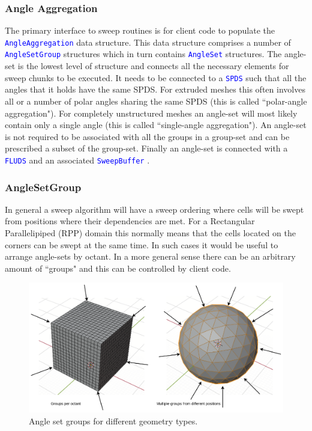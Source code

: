 \documentclass[11pt,letterpaper,titlepage]{article}
\newcommand{\xmltag}[1]{\textcolor{blue}{ \texttt{#1}} }
\numberwithin{equation}{section}
\begin{document}
\subsubsection{Angle Aggregation}
The primary interface to sweep routines is for client code to populate the \xmltag{AngleAggregation} data structure. This data structure comprises a number of \xmltag{AngleSetGroup} structures which in turn contains \xmltag{AngleSet} structures. The angle-set is the lowest level of structure and connects all the necessary elements for sweep chunks to be executed. It needs to be connected to a \xmltag{SPDS} such that all the angles that it holds have the same SPDS. For extruded meshes this often involves all or a number of polar angles sharing the same SPDS (this is called ``polar-angle aggregation"). For completely unstructured meshes an angle-set will most likely contain only a single angle (this is called ``single-angle aggregation"). An angle-set is not required to be associated with all the groups in a group-set and can be prescribed a subset of the group-set. Finally an angle-set is connected with a \xmltag{FLUDS} and an associated \xmltag{SweepBuffer}.


\vspace{0.25in}
\subsubsection{AngleSetGroup}
In general a sweep algorithm will have a sweep ordering where cells will be swept from positions where their dependencies are met. For a Rectangular Parallelipiped (RPP) domain this normally means that the cells located on the corners can be swept at the same time. In such cases it would be useful to arrange angle-sets by octant. In a more general sense there can be an arbitrary amount of ``groups" and this can be controlled by client code.

\begin{figure}[H]
\centering
\includegraphics[width=1.0\linewidth]{LatexDraw/AngleSetGroups}
\caption{Angle set groups for different geometry types.}
\label{fig:anglesetgroups}
\end{figure}
\end{document}
